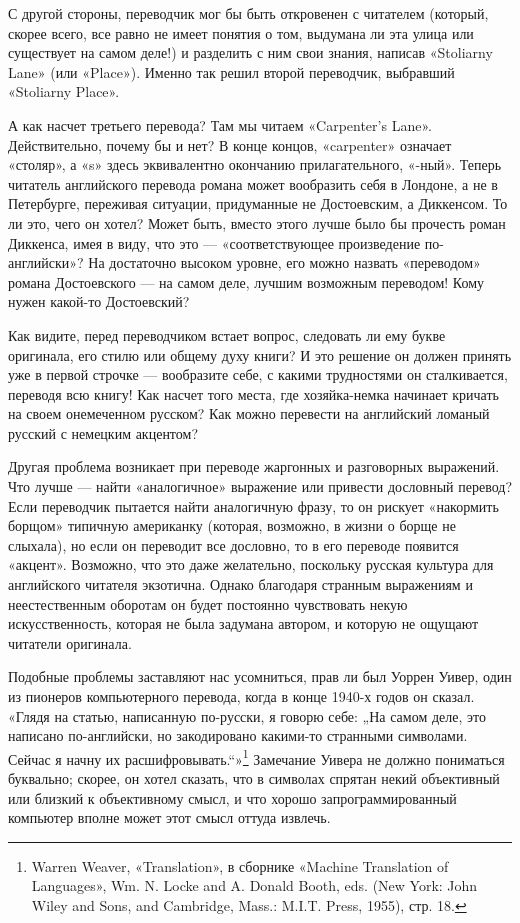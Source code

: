 \documentclass[../main.tex]{subfiles}
\begin{document}
С другой стороны, переводчик мог бы быть откровенен с читателем (который, скорее всего, все равно не имеет понятия о том, выдумана ли эта улица или существует на самом деле!) и разделить с ним свои знания, написав «Stoliarny Lane» (или «Place»). Именно так решил второй переводчик, выбравший «Stoliarny Place».

А как насчет третьего перевода? Там мы читаем «Carpenter's Lane». Действительно, почему бы и нет? В конце концов, «carpenter» означает «столяр», а «s» здесь эквивалентно окончанию прилагательного, «-ный». Теперь читатель английского перевода романа может вообразить себя в Лондоне, а не в Петербурге, переживая ситуации, придуманные не Достоевским, а Диккенсом. То ли это, чего он хотел? Может быть, вместо этого лучше было бы прочесть роман Диккенса, имея в виду, что это --- «соответствующее произведение по-английски»? На достаточно высоком уровне, его можно назвать «переводом» романа Достоевского --- на самом деле, лучшим возможным переводом! Кому нужен какой-то Достоевский?

Как видите, перед переводчиком встает вопрос, следовать ли ему букве оригинала, его стилю или общему духу книги? И это решение он должен принять уже в первой строчке --- вообразите себе, с какими трудностями он сталкивается, переводя всю книгу! Как насчет того места, где хозяйка-немка начинает кричать на своем онемеченном русском? Как можно перевести на английский ломаный русский с немецким акцентом?

Другая проблема возникает при переводе жаргонных и разговорных выражений. Что лучше --- найти «аналогичное» выражение или привести дословный перевод? Если переводчик пытается найти аналогичную фразу, то он рискует «накормить борщом» типичную американку (которая, возможно, в жизни о борще не слыхала), но если он переводит все дословно, то в его переводе появится «акцент». Возможно, что это даже желательно, поскольку русская культура для английского читателя экзотична. Однако благодаря странным выражениям и неестественным оборотам он будет постоянно чувствовать некую искусственность, которая не была задумана автором, и которую не ощущают читатели оригинала.

Подобные проблемы заставляют нас усомниться, прав ли был Уоррен Уивер, один из пионеров компьютерного перевода, когда в конце 1940-х годов он сказал. «Глядя на статью, написанную по-русски, я говорю себе: „На самом деле, это написано по-английски, но закодировано какими-то странными символами. Сейчас я начну их расшифровывать.``»\footnote{Warren Weaver, «Translation», в сборнике «Machine Translation of Languages», Wm. N. Locke and A. Donald Booth, eds. (New York: John Wiley and Sons, and Cambridge, Mass.: M.I.T. Press, 1955), стр. 18.} Замечание Уивера не должно пониматься буквально; скорее, он хотел сказать, что в символах спрятан некий объективный или близкий к объективному смысл, и что хорошо запрограммированный компьютер вполне может этот смысл оттуда извлечь.
\end{document}
